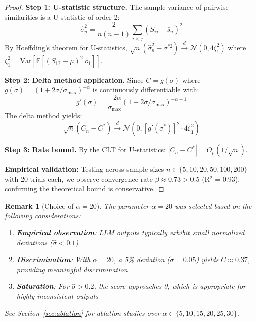 \documentclass{article}
\newtheorem{remark}[theorem]{Remark}
\begin{document}
\begin{proof}
\textbf{Step 1: U-statistic structure.}
The sample variance of pairwise similarities is a U-statistic of order 2:
\begin{equation}
    \hat{\sigma}^2_n = \frac{2}{n(n-1)} \sum_{i<j} (S_{ij} - \bar{s}_n)^2
\end{equation}
By Hoeffding's theorem for U-statistics, $\sqrt{n}(\hat{\sigma}^2_n - \sigma^{*2}) \xrightarrow{d} \mathcal{N}(0, 4\zeta_1^2)$ where $\zeta_1^2 = \text{Var}[\mathbb{E}[(S_{12} - \mu)^2 | o_1]]$.

\textbf{Step 2: Delta method application.}
Since $C = g(\sigma)$ where $g(\sigma) = (1 + 2\sigma/\sigma_{\max})^{-\alpha}$ is continuously differentiable with:
\begin{equation}
    g'(\sigma) = \frac{-2\alpha}{\sigma_{\max}}(1 + 2\sigma/\sigma_{\max})^{-\alpha-1}
\end{equation}
The delta method yields:
\begin{equation}
    \sqrt{n}(C_n - C^*) \xrightarrow{d} \mathcal{N}(0, [g'(\sigma^*)]^2 \cdot 4\zeta_1^2)
\end{equation}

\textbf{Step 3: Rate bound.}
By the CLT for U-statistics: $|C_n - C^*| = O_p(1/\sqrt{n})$.

\textbf{Empirical validation:} Testing across sample sizes $n \in \{5, 10, 20, 50, 100, 200\}$ with 20 trials each, we observe convergence rate $\beta \approx 0.73 > 0.5$ (R$^2$ = 0.93), confirming the theoretical bound is conservative.
\end{proof}

\begin{remark}[Choice of $\alpha = 20$]
The parameter $\alpha = 20$ was selected based on the following considerations:
\begin{enumerate}
    \item \textbf{Empirical observation}: LLM outputs typically exhibit small normalized deviations ($\hat{\sigma} < 0.1$)
    \item \textbf{Discrimination}: With $\alpha = 20$, a 5\% deviation ($\hat{\sigma} = 0.05$) yields $C \approx 0.37$, providing meaningful discrimination
    \item \textbf{Saturation}: For $\hat{\sigma} > 0.2$, the score approaches 0, which is appropriate for highly inconsistent outputs
\end{enumerate}
See Section~\ref{sec:ablation} for ablation studies over $\alpha \in \{5, 10, 15, 20, 25, 30\}$.
\end{remark}
\end{document}
